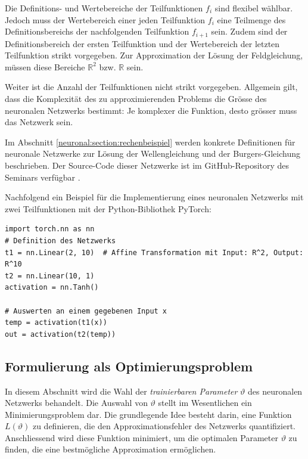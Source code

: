 Die Definitions- und Wertebereiche der Teilfunktionen \( f_i \) sind flexibel wählbar. 
Jedoch muss der Wertebereich einer jeden Teilfunktion \( f_i \) eine Teilmenge des Definitionsbereichs der nachfolgenden Teilfunktion \( f_{i+1} \) sein.
Zudem sind der Definitionsbereich der ersten Teilfunktion und der Wertebereich der letzten Teilfunktion strikt vorgegeben. 
Zur Approximation der Lösung der Feldgleichung, müssen diese Bereiche \( \mathbb{R}^2 \) bzw. \( \mathbb{R} \) sein.

Weiter ist die Anzahl der Teilfunktionen nicht strikt vorgegeben. 
Allgemein gilt, dass die Komplexität des zu approximierenden Problems die Grösse des neuronalen Netzwerks bestimmt: Je komplexer die Funktion, desto grösser muss das Netzwerk sein.

Im Abschnitt \ref{neuronal:section:rechenbeispiel} werden konkrete Definitionen für neuronale Netzwerke zur Lösung der Wellengleichung und der Burgers-Gleichung beschrieben.
Der Source-Code dieser Netzwerke ist im GitHub-Repository des Seminars verfügbar \cite{neuronal:github_source_code}.

Nachfolgend ein Beispiel für die Implementierung eines neuronalen Netzwerks mit zwei Teilfunktionen mit der Python-Bibliothek PyTorch:

\begin{lstlisting}
import torch.nn as nn
# Definition des Netzwerks
t1 = nn.Linear(2, 10)  # Affine Transformation mit Input: R^2, Output: R^10
t2 = nn.Linear(10, 1)
activation = nn.Tanh()

# Auswerten an einem gegebenen Input x
temp = activation(t1(x))
out = activation(t2(temp))
\end{lstlisting}

\subsection{Formulierung als Optimierungsproblem}\label{neuronal:subsection:optimierungsproblem}
In diesem Abschnitt wird die Wahl der \emph{trainierbaren Parameter} $\vartheta$ des neuronalen Netzwerks behandelt.
Die Auswahl von $\vartheta$ stellt im Wesentlichen ein Minimierungsproblem dar.
Die grundlegende Idee besteht darin, eine Funktion \( L(\vartheta) \) zu definieren, die den Approximationsfehler des Netzwerks quantifiziert.
Anschliessend wird diese Funktion minimiert, um die optimalen Parameter $\vartheta$ zu finden, die eine bestmögliche Approximation ermöglichen.

